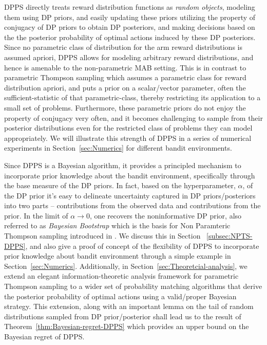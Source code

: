 \documentclass[10pt]{article}
\begin{document}
DPPS directly treats reward distribution functions as \textit{random objects}, modeling them using DP priors, and easily updating these priors utilizing the property of {conjugacy} of DP priors to obtain DP posteriors, and making decisions based on the the posterior probability of optimal actions induced by these DP posteriors. Since no parametric class of distribution for the arm reward distributions is assumed apriori, DPPS allows for modeling arbitrary reward distributions, and hence  is amenable to the non-parametric MAB setting.   This is in contrast to parametric Thompson sampling which assumes a parametric class for reward distribution apriori, and puts a prior on a scalar/vector parameter, often the sufficient-statistic of that parametric-class, thereby restricting its application to a small set of problems. Furthermore, these parametric priors do not enjoy the property of conjugacy very often, and it becomes challenging to sample from their posterior distributions even for the restricted class of problems they can model appropriately.  We will illustrate this strength of DPPS in a series of numerical experiments in Section~\ref{sec:Numerics} for different bandit environments.

Since DPPS is a Bayesian algorithm, it provides a principled mechanism to incorporate prior knowledge about the bandit environment, specifically through the base measure of the DP priors. In fact, based on the hyperparameter, $\alpha$, of the DP prior it's easy to delineate uncertainty captured in DP priors/posteriors into two parts --  contributions from the observed data and contributions from the prior. In the limit of $\alpha \to  0$, one recovers the noninformative DP prior, also referred to as \textit{Bayesian Bootstrap} which is the basis for Non Paramteric Thompson sampling introduced in \cite{riou2020bandit}.    We discuss this in Section ~\ref{subsec:NPTS-DPPS}, and also give a proof of concept of the flexibility of DPPS to incorporate prior knowledge about bandit environment through a simple example in Section~\ref{sec:Numerics}. Additionally, in Section~\ref{sec:Theoretcial-analysis}, we extend an elegant information-theoretic analysis framework for parametric Thompson sampling to a wider set of probability matching algorithms that derive the posterior probability of optimal actions using a valid/proper Bayesian strategy. This extension, along with an important lemma on the tail of random distributions sampled from DP prior/posterior shall lead us to the result of Theorem~\ref{thm:Bayesian-regret-DPPS} which provides an upper bound on the Bayesian regret of DPPS. 
\end{document}
